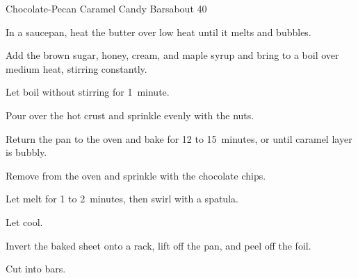 \begin{recipe}{Chocolate-Pecan Caramel Candy Bars}{}{about 40}
\begin{directions}
\item In a saucepan, heat the butter over low heat until it melts and bubbles.
\item Add the brown sugar, honey, cream, and maple syrup and bring to a boil over medium heat, stirring constantly.
\item Let boil without stirring for 1~minute.
\item Pour over the hot crust and sprinkle evenly with the nuts.
\item Return the pan to the oven and bake for 12 to 15~minutes, or until caramel layer is bubbly.
\item Remove from the oven and sprinkle with the chocolate chips.
\item Let melt for 1 to 2~minutes, then swirl with a spatula.
\item Let cool.
\item Invert the baked sheet onto a rack, lift off the pan, and peel off the foil.
\item Cut into bars.
\end{directions}

\end{recipe}

